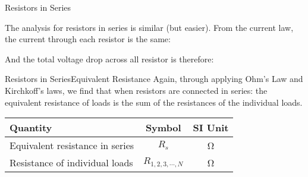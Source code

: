\documentclass[12pt,aspectratio=169]{beamer}
\newcommand{\eq}[2]{\vspace{#1}{\Large\begin{displaymath}#2\end{displaymath}}}
\begin{document}
\begin{frame}{Resistors in Series}
  \begin{center}
  \end{center}

  \vspace{.1in}The analysis for resistors in series is similar (but easier).
  From the current law, the current through each resistor is the same:

  \eq{-.2in}{I_1=I_2=I_3=\cdots=I}

  \vspace{-.15in}And the total voltage drop across all resistor is therefore:

  \eq{-.3in}{V=V_1+V_2+V_3+\cdot=I(R_1+R_2+R_3+\cdots)}
\end{frame}



\begin{frame}{Resistors in Series}{Equivalent Resistance}
  Again, through applying Ohm's Law and Kirchkoff's laws, we find that when
  resistors are connected in series: the equivalent resistance of loads is the
  sum of the resistances of the individual loads.
  
  \eq{-.2in}{
    \boxed{R_s=\sum_{i=1}^{N}R_i}
  }
  \begin{center}
    \begin{tabular}{l|c|c}
      \rowcolor{pink}
      \textbf{Quantity} & \textbf{Symbol} & \textbf{SI Unit} \\ \hline
      Equivalent resistance in series & $R_s$ & \si{\ohm} \\
      Resistance of individual loads & $R_{1,2,3,\cdots,N}$ & \si{\ohm}
    \end{tabular}
  \end{center}
\end{frame}
\end{document}
